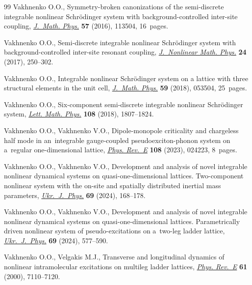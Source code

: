 \documentclass[pdftex]{sigma}
\numberwithin{equation}{section}
\begin{document}
\begin{thebibliography}{99}
Vakhnenko O.O., Symmetry-broken canonizations of the semi-discrete integrable
 nonlinear {S}chr\"odinger system with background-controlled inter-site
 coupling, \href{https://doi.org/10.1063/1.4968244}{\textit{J.~Math. Phys.}}
 \textbf{57} (2016), 113504, 16~pages.

Vakhnenko O.O., Semi-discrete integrable nonlinear {S}chr\"odinger system with
 background-controlled inter-site resonant coupling,
 \href{https://doi.org/10.1080/14029251.2017.1316011}{\textit{J.~Nonlinear
 Math. Phys.}} \textbf{24} (2017), 250--302.

Vakhnenko O.O., Integrable nonlinear {S}chr\"odinger system on a lattice with
 three structural elements in the unit cell,
 \href{https://doi.org/10.1063/1.4994622}{\textit{J.~Math. Phys.}} \textbf{59}
 (2018), 053504, 25~pages.

Vakhnenko O.O., Six-component semi-discrete integrable nonlinear
 {S}chr\"odinger system,
 \href{https://doi.org/10.1007/s11005-018-1049-0}{\textit{Lett. Math. Phys.}}
 \textbf{108} (2018), 1807--1824.

Vakhnenko O.O., Vakhnenko V.O., Dipole-monopole criticality and chargeless half
 mode in an~integrable gauge-coupled pseudoexciton-phonon system on a~regular
 one-dimensional lattice,
 \href{https://doi.org/10.1103/physreve.108.024223}{\textit{Phys. Rev.~E}}
 \textbf{108} (2023), 024223, 8~pages.

Vakhnenko O.O., Vakhnenko V.O., Development and analysis of novel integrable
 nonlinear dynamical systems on quasi-one-dimensional lattices. Two-component
 nonlinear system with the on-site and spatially distributed inertial mass
 parameters,
 \href{https://doi.org/10.15407/ujpe69.3.168}{\textit{Ukr.~J.~Phys.}}
 \textbf{69} (2024), 168--178.

Vakhnenko O.O., Vakhnenko V.O., Development and analysis of novel integrable
 nonlinear dynamical systems on quasi-one-dimensional lattices. Parametrically
 driven nonlinear system of pseudo-excitations on a~two-leg ladder lattice,
 \href{https://doi.org/10.15407/ujpe69.8.577}{\textit{Ukr.~J.~Phys.}}
 \textbf{69} (2024), 577--590.


Vakhnenko O.O., Velgakis M.J., Transverse and longitudinal dynamics of
 nonlinear intramolecular excitations on multileg ladder lattices,
 \href{https://doi.org/10.1103/PhysRevE.61.7110}{\textit{Phys. Rev.~E}}
 \textbf{61} (2000), 7110--7120.


\end{thebibliography}
\end{document}
